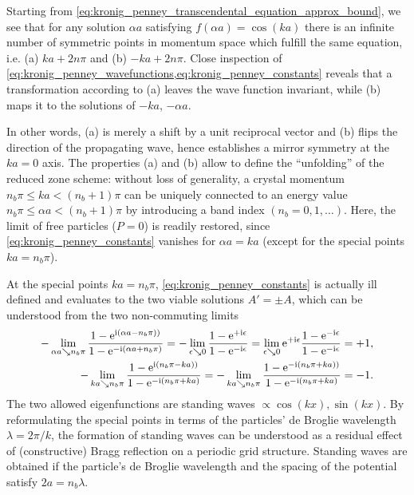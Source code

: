 Starting from \cref{eq:kronig_penney_transcendental_equation_approx_bound}, we see that for any solution $\alpha a$ satisfying $f(\alpha a)=\cos(k a)$ there is an infinite number of symmetric points in momentum space which fulfill the same equation, i.e. (a) $ka + 2n\pi$ and (b) $-ka+2n\pi$.
Close inspection of \cref{eq:kronig_penney_wavefunctions,eq:kronig_penney_constants} reveals that a transformation according to (a) leaves the wave function invariant, while (b) maps it to the solutions of $-ka$, $-\alpha a$.

In other words, (a) is merely a shift by a unit reciprocal vector and (b) flips the direction of the propagating wave, hence establishes a mirror symmetry at the $ka=0$ axis.
The properties (a) and (b) allow to define the ``unfolding'' of the reduced zone scheme:
without loss of generality, a crystal momentum $n_b\pi\leq ka<(n_b+1)\pi$ can be uniquely connected to an energy value $n_b\pi\leq \alpha a<(n_b+1)\pi$ by introducing a band index $(n_b=0,1,\dots)$.
Here, the limit of free particles ($P=0$) is readily restored, since \cref{eq:kronig_penney_constants} vanishes for $\alpha a = ka$ (except for the special points $ka=n_b\pi$).

At the special points $ka=n_b\pi$, \cref{eq:kronig_penney_constants} is actually ill defined and evaluates to the two viable solutions $A'=\pm A$, which can be understood from the two non-commuting limits
\begin{align}
    -\lim_{\alpha a \searrow n_b\pi}\frac{1-\mathrm e^{\mathrm i(\alpha a-n_b\pi))}}{1-\mathrm e^{-\mathrm i(\alpha a+n_b\pi)}}
    =
    -\lim_{\epsilon\searrow0}\frac{1-\mathrm e^{+\mathrm i\epsilon}}{1-\mathrm e^{-\mathrm i\epsilon}}
    =
    \lim_{\epsilon\searrow0}\mathrm e^{+\mathrm i\epsilon}\frac{1-\mathrm e^{-\mathrm i\epsilon}}{1-\mathrm e^{-\mathrm i\epsilon}}
    =
    +1,
    \\
    -\lim_{k a \searrow n_b\pi}\frac{1-\mathrm e^{\mathrm i(n_b\pi - ka))}}{1-\mathrm e^{-\mathrm i(n_b\pi+ka)}}
    =
    -\lim_{k a \searrow n_b\pi}\frac{1-\mathrm e^{-\mathrm i(n_b\pi + ka))}}{1-\mathrm e^{-\mathrm i(n_b\pi+ka)}}
    =
    -1.
\end{align}
The two allowed eigenfunctions are standing waves $\propto \cos(kx),\sin(kx)$.
By reformulating the special points in terms of the particles' de Broglie wavelength $\lambda=2\pi/k$, the formation of standing waves can be understood as a residual effect of (constructive) Bragg reflection on a periodic grid structure.
Standing waves are obtained if the particle's de Broglie wavelength and the spacing of the potential satisfy $2a=n_b\lambda$.

